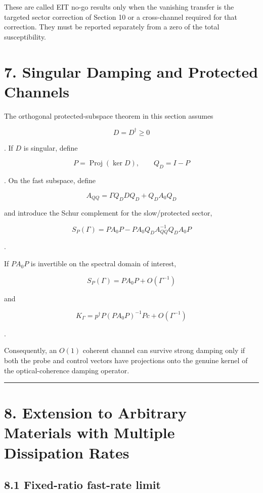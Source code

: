 \documentclass[
  10pt,
  a4paper,
]{article}
\begin{document}
These are called EIT no-go results only when the vanishing transfer is
the targeted sector correction of Section 10 or a cross-channel required
for that correction. They must be reported separately from a zero of the
total susceptibility.

\section{7. Singular Damping and Protected
Channels}\label{singular-damping-and-protected-channels}

The orthogonal protected-subspace theorem in this section assumes

\[
D=D^\dagger\ge0
\]

. If \(D\) is singular, define

\[
P=\operatorname{Proj}(\ker D),
\qquad
Q_D=I-P
\]

. On the fast subspace, define

\[
A_{QQ}
=\Gamma Q_DDQ_D+Q_DA_0Q_D
\]

and introduce the Schur complement for the slow/protected sector,

\[
S_P(\Gamma)
=PA_0P-PA_0Q_DA_{QQ}^{-1}Q_DA_0P
\]

.

If \(PA_0P\) is invertible on the spectral domain of interest,

\[
S_P(\Gamma)=PA_0P+O(\Gamma^{-1})
\]

and

\[
\boxed{
K_\Gamma
=p^\dagger P(PA_0P)^{-1}Pc
+O(\Gamma^{-1})
}
\]

.

Consequently, an \(O(1)\) coherent channel can survive strong damping
only if both the probe and control vectors have projections onto the
genuine kernel of the optical-coherence damping operator.

\begin{center}\rule{0.5\linewidth}{0.5pt}\end{center}

\section{8. Extension to Arbitrary Materials with Multiple Dissipation
Rates}\label{extension-to-arbitrary-materials-with-multiple-dissipation-rates}

\subsection{8.1 Fixed-ratio fast-rate
limit}\label{fixed-ratio-fast-rate-limit}
\end{document}
